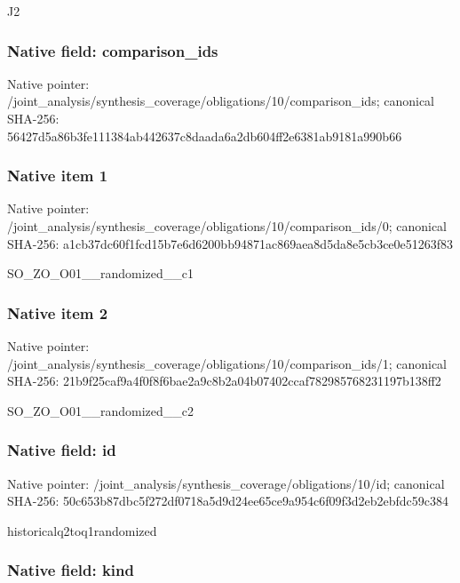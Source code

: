 \documentclass[10pt,a4paper]{article}
\begin{document}
J2


\subsubsection{Native field: comparison\_ids}


Native pointer: /joint\_analysis/synthesi\allowbreak{}s\_coverage/obligations/1\allowbreak{}0/comparison\_ids; canonical SHA-256: 56427d5a86b3fe111384ab44\allowbreak{}2637c8daada6a2db604ff2e6\allowbreak{}381ab9181a990b66



\subsubsection{Native item 1}


Native pointer: /joint\_analysis/synthesi\allowbreak{}s\_coverage/obligations/1\allowbreak{}0/comparison\_ids/0; canonical SHA-256: a1cb37dc60f1fcd15b7e6d62\allowbreak{}00bb94871ac869aea8d5da8e\allowbreak{}5cb3ce0e51263f83


SO\_ZO\_O01\_\_randomized\_\_c1


\subsubsection{Native item 2}


Native pointer: /joint\_analysis/synthesi\allowbreak{}s\_coverage/obligations/1\allowbreak{}0/comparison\_ids/1; canonical SHA-256: 21b9f25caf9a4f0f8f6bae2a\allowbreak{}9c8b2a04b07402ccaf782985\allowbreak{}768231197b138ff2


SO\_ZO\_O01\_\_randomized\_\_c2


\subsubsection{Native field: id}


Native pointer: /joint\_analysis/synthesi\allowbreak{}s\_coverage/obligations/1\allowbreak{}0/id; canonical SHA-256: 50c653b87dbc5f272df0718a\allowbreak{}5d9d24ee65ce9a954c6f09f3\allowbreak{}d2eb2ebfdc59c384


historicalq2toq1randomized


\subsubsection{Native field: kind}
\end{document}
